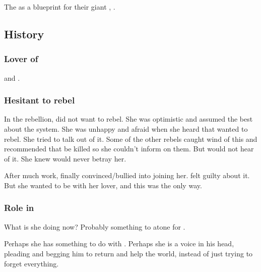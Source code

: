 The  as a blueprint for their giant \carcer, \iquin. 









\subsection{History}





\subsubsection{Lover of \Shiaraid}
\Shiaraid{} and \Aryal{} . 





\subsubsection{Hesitant to rebel}
In the \Merkyran{} rebellion, \Eryal{} did not want to rebel.
She was optimistic and assumed the best about the \Merkyran{} system. 
She was unhappy and afraid when she heard that \Shiaraid{} wanted to rebel. 
She tried to talk \Shiaraid{} out of it. 
Some of the other rebels caught wind of this and recommended that \Eryal{} be killed so she couldn't inform on them. 
But \Shiaraid{} would not hear of it. 
She knew \Eryal{} would never betray her. 

After much work, \Shiaraid{} finally convinced/bullied \Eryal{} into joining her. 
\Eryal{} felt guilty about it. 
But she wanted to be with her lover, and this was the only way. 





\subsubsection{Role in \SentinelsofMiithEmph}
What is she doing now? 
Probably something to atone for .

Perhaps she has something to do with \Sithiyacaan. 
Perhaps she is a voice in his head, pleading and begging him to return and help the world, instead of just trying to forget everything. 

